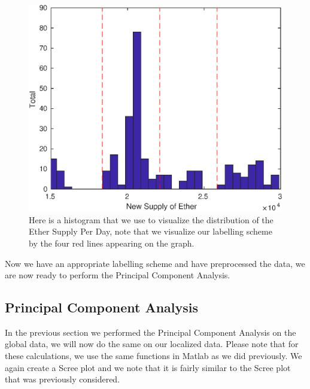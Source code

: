 \documentclass{article}
\begin{document}
\begin{figure}[H]
\centering
\caption{Here is a histogram that we use to visualize the distribution of the Ether Supply Per Day, note that we visualize our labelling scheme by the four red lines appearing on the graph.}
\includegraphics[scale=0.75]{local/eth_supplyOnly.eps}
\end{figure}

Now we have an appropriate labelling scheme and have preprocessed the data, we are now ready to perform the Principal Component Analysis.

\subsection{Principal Component Analysis}
In the previous section we performed the Principal Component Analysis on the global data, we will now do the same on our localized data. Please note that for these calculations, we use the same functions in Matlab as we did previously. We again create a Scree plot and we note that it is fairly similar to the Scree plot that was previously considered.
\end{document}
